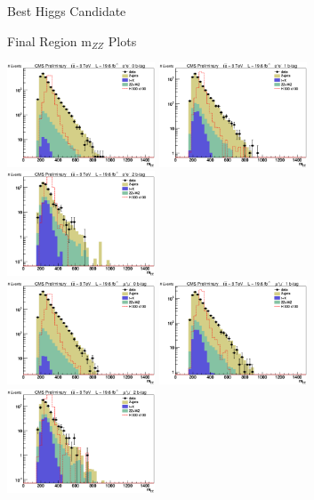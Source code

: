 \begin{frame}{Best Higgs Candidate}


\end{frame}

\begin{frame}{Final Region m$_{ZZ}$ Plots}
\begin{center}
\includegraphics[width=0.33\textwidth]{images/final/0/el/mZZ_signal_log.eps}
\includegraphics[width=0.33\textwidth]{images/final/1/el/mZZ_signal_log.eps}
\includegraphics[width=0.33\textwidth]{images/final/2/el/mZZ_signal_log.eps}\\
\includegraphics[width=0.33\textwidth]{images/final/0/mu/mZZ_signal_log.eps}
\includegraphics[width=0.33\textwidth]{images/final/1/mu/mZZ_signal_log.eps}
\includegraphics[width=0.33\textwidth]{images/final/2/mu/mZZ_signal_log.eps}
\end{center}
\end{frame}


